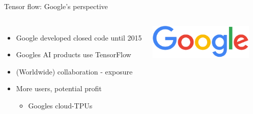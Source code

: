 \begin{frame}{Tensor flow: Google's perspective}
        \begin{columns}[T]
            \vspace{1cm}
        \begin{itemize}
            \item Google developed closed code until 2015
            \item Googles AI products use TensorFlow
            \item (Worldwide) collaboration - exposure
            \item More users, potential profit
            \begin{itemize}
                \item Googles cloud-TPUs
            \end{itemize}
        \end{itemize}
        
             \vspace{-0cm}
             \hspace*{-5cm}
             \includegraphics[width=5cm]{assets/GoogleTransp.png}
                 \\
                 \vspace{-.1cm}
                 \hspace*{-5cm}
        \end{columns}

\end{frame}


